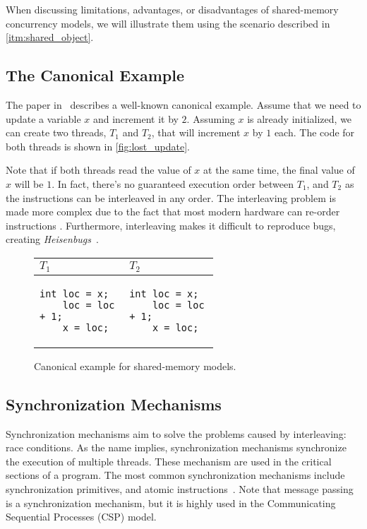 When discussing limitations, advantages, or disadvantages of shared-memory concurrency models,
we will illustrate them using the scenario described in \autoref{itm:shared_object}.

\subsection{The Canonical Example}

The paper in~\cite{jaffe2011impactOfMemoryModels} describes a well-known canonical example.
Assume that we need to update a variable $x$ and increment it by $2$.
Assuming $x$ is already initialized, we can create two threads, $T_1$ and $T_2$, that will
increment $x$ by $1$ each. The code for both threads is shown in \autoref{fig:lost_update}.

Note that if both threads read the value of $x$ at the same time,
the final value of $x$ will be $1$. In fact, there's no guaranteed execution
order between $T_1$, and $T_2$ as the instructions can be interleaved
in any order. The interleaving problem is made more complex
due to the fact that most modern hardware can re-order instructions
\cite{huang2016debuggingConcurrentPrograms}. Furthermore, interleaving
makes it difficult to reproduce bugs, creating \textit{Heisenbugs}~\cite{rookout2021heisenbug,
gray1986whyComputersStop}.

\begin{figure}[!htb]
    \centering
    \begin{tabular}{|p{0.3\linewidth}|p{0.3\linewidth}|}
        \hline
        \textbf{$T_1$} & \textbf{$T_2$} \\
        \hline
        \begin{Verbatim}[fontsize=\small]
    int loc = x;
    loc = loc + 1;
    x = loc;
        \end{Verbatim}
        &
        \begin{Verbatim}[fontsize=\small]
    int loc = x;
    loc = loc + 1;
    x = loc;
        \end{Verbatim}
        \\
        \hline
    \end{tabular}
    \caption{Canonical example for shared-memory models.}
    \label{fig:lost_update}
\end{figure}

\subsection{Synchronization Mechanisms}
Synchronization mechanisms aim to solve the problems caused by interleaving: race conditions.
As the name implies, synchronization mechanisms synchronize the execution of multiple threads.
These mechanism are used in the critical sections of a program.
The most common synchronization mechanisms include synchronization primitives,
and atomic instructions~\cite{leroy2021sharedMemorySlides}. Note that message passing is a synchronization
mechanism, but it is highly used in the Communicating Sequential Processes (CSP) model.

